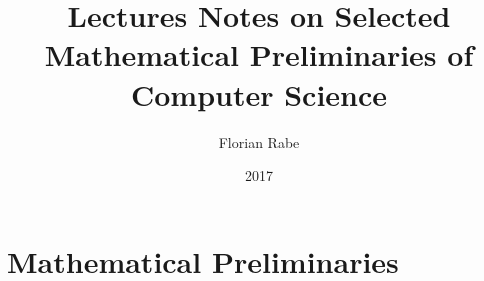 \documentclass{book}
\title{Lectures Notes on Selected Mathematical Preliminaries of Computer Science}
\author{Florian Rabe}
\date{2017}
\begin{document}
\maketitle

\tableofcontents
\newpage

\chapter{Mathematical Preliminaries}


%
%
\end{document}
